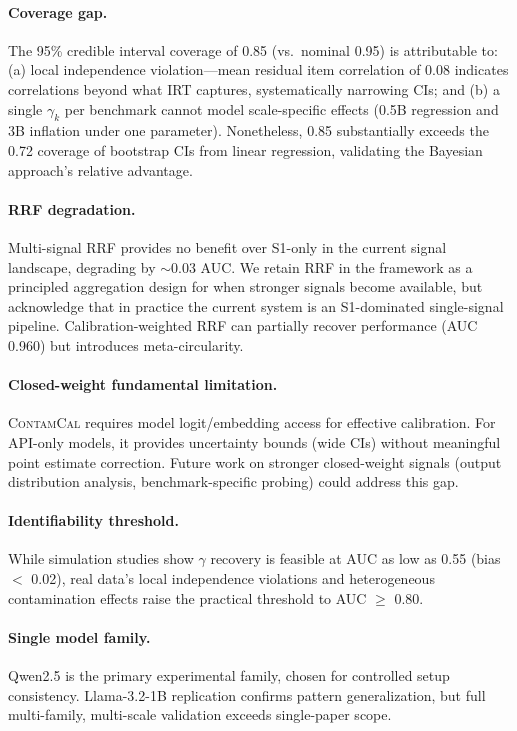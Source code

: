 \documentclass[11pt,a4paper]{article}
\newcommand{\method}{\textsc{ContamCal}}
\begin{document}
\paragraph{Coverage gap.}
The 95\% credible interval coverage of 0.85 (vs.\ nominal 0.95) is attributable to: (a) local independence violation---mean residual item correlation of 0.08 indicates correlations beyond what IRT captures, systematically narrowing CIs; and (b) a single $\gamma_k$ per benchmark cannot model scale-specific effects (0.5B regression and 3B inflation under one parameter). Nonetheless, 0.85 substantially exceeds the 0.72 coverage of bootstrap CIs from linear regression, validating the Bayesian approach's relative advantage.

\paragraph{RRF degradation.}
Multi-signal RRF provides no benefit over S1-only in the current signal landscape, degrading by $\sim$0.03 AUC. We retain RRF in the framework as a principled aggregation design for when stronger signals become available, but acknowledge that in practice the current system is an S1-dominated single-signal pipeline. Calibration-weighted RRF can partially recover performance (AUC 0.960) but introduces meta-circularity.

\paragraph{Closed-weight fundamental limitation.}
\method{} requires model logit/embedding access for effective calibration. For API-only models, it provides uncertainty bounds (wide CIs) without meaningful point estimate correction. Future work on stronger closed-weight signals (output distribution analysis, benchmark-specific probing) could address this gap.

\paragraph{Identifiability threshold.}
While simulation studies show $\gamma$ recovery is feasible at AUC as low as 0.55 (bias $<$ 0.02), real data's local independence violations and heterogeneous contamination effects raise the practical threshold to AUC $\geq$ 0.80.

\paragraph{Single model family.}
Qwen2.5 is the primary experimental family, chosen for controlled setup consistency. Llama-3.2-1B replication confirms pattern generalization, but full multi-family, multi-scale validation exceeds single-paper scope.
\end{document}
